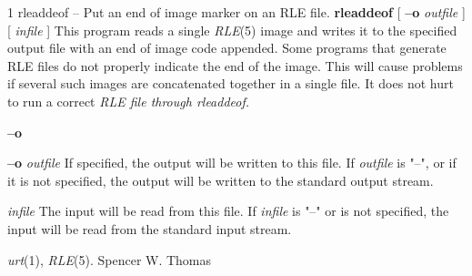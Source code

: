 %
%
%
 1
rleaddeof -- Put an end of image marker on an RLE file.
{\bf rleaddeof}
[
{\bf --o} 
{\it outfile}
] [ 
{\it infile}
]
This program reads a single
{\it RLE}{\rm (5)}
image and writes it to the specified output file with an end of image
code appended.  Some programs that generate RLE files do not properly
indicate the end of the image.  This will cause problems if several
such images are concatenated together in a single file.  It does not
hurt to run a correct %
\it RLE \rm%
file through
{\it rleaddeof}{\rm .}
\begin{TPlist}{{\bf --o} }
\item[{{\bf --o} }]
{\it outfile}
If specified, the output will be written to this file.  If 
{\it outfile}
is "--", or if it is not specified, the output will be written to the
standard output stream.
\item[{{\it infile}}]
The input will be read from this file.  If
{\it infile}
is "--" or is not specified, the input will be read from the standard
input stream.
\end{TPlist}
{\it urt}{\rm (1),}
{\it RLE}{\rm (5).}
Spencer W. Thomas
\newpage


